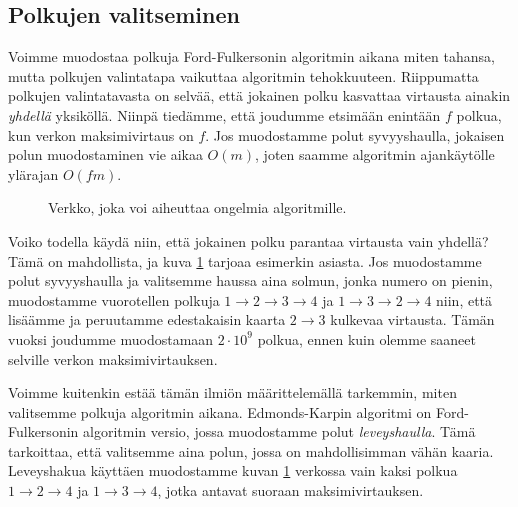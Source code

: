 \subsection{Polkujen valitseminen}

Voimme muodostaa polkuja Ford-Fulkersonin algoritmin aikana miten tahansa,
mutta polkujen valintatapa vaikuttaa algoritmin tehokkuuteen.
Riippumatta polkujen valintatavasta on selvää,
että jokainen polku kasvattaa virtausta ainakin \emph{yhdellä} yksiköllä.
Niinpä tiedämme, että joudumme etsimään enintään $f$ polkua,
kun verkon maksimivirtaus on $f$.
Jos muodostamme polut syvyyshaulla,
jokaisen polun muodostaminen vie aikaa $O(m)$,
joten saamme algoritmin ajankäytölle ylärajan $O(fm)$.

\begin{figure}
\center
\begin{center}
\end{center}
\caption{Verkko, joka voi aiheuttaa ongelmia algoritmille.}
\label{fig:polhuo}
\end{figure}

Voiko todella käydä niin, että jokainen polku parantaa
virtausta vain yhdellä?
Tämä on mahdollista, ja kuva \ref{fig:polhuo} tarjoaa esimerkin asiasta.
Jos muodostamme polut syvyyshaulla ja valitsemme haussa aina solmun,
jonka numero on pienin,
muodostamme vuorotellen polkuja $1 \rightarrow 2 \rightarrow 3 \rightarrow 4$
ja $1 \rightarrow 3 \rightarrow 2 \rightarrow 4$ niin, että
lisäämme ja peruutamme edestakaisin kaarta $2 \rightarrow 3$ kulkevaa virtausta.
Tämän vuoksi joudumme muodostamaan $2 \cdot 10^9$ polkua,
ennen kuin olemme saaneet selville verkon maksimivirtauksen.

Voimme kuitenkin estää tämän ilmiön määrittelemällä tarkemmin,
miten valitsemme polkuja algoritmin aikana.
Edmonds-Karpin algoritmi on Ford-Fulkersonin algoritmin versio,
jossa muodostamme polut \emph{leveyshaulla}.
Tämä tarkoittaa, että valitsemme aina
polun, jossa on mahdollisimman vähän kaaria.
Leveyshakua käyttäen muodostamme kuvan \ref{fig:polhuo} verkossa
vain kaksi polkua $1 \rightarrow 2 \rightarrow 4$ ja
$1 \rightarrow 3 \rightarrow 4$, jotka antavat suoraan maksimivirtauksen.

